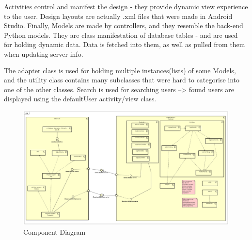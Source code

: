 Activities control and manifest the design - they provide dynamic view experience to the user. Design layouts are actually .xml files that were made in Android Studio. Finally, Models are made by controllers, and they resemble the back-end Python models. They are class manifestation of database tables - and are used for holding dynamic data. Data is fetched into them, as well as pulled from them when updating server info.

The adapter class is used for holding multiple instances(lists) of some Models, and the utility class contains many subclasses that were hard to categorise into one of the other classes. Search is used for searching users --> found users are displayed using the defaultUser activity/view class.

\begin{figure}[H]
	\includegraphics[width=\linewidth]{diagrams/Component Diagram0.png}
	\caption{Component Diagram}
	\label{fig:component_diag}
\end{figure}

\eject